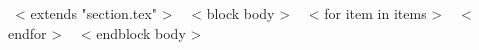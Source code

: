 ~< extends "section.tex" >~
~< block body >~
  ~< for item in items >~
  ~< endfor >~
~< endblock body >~
